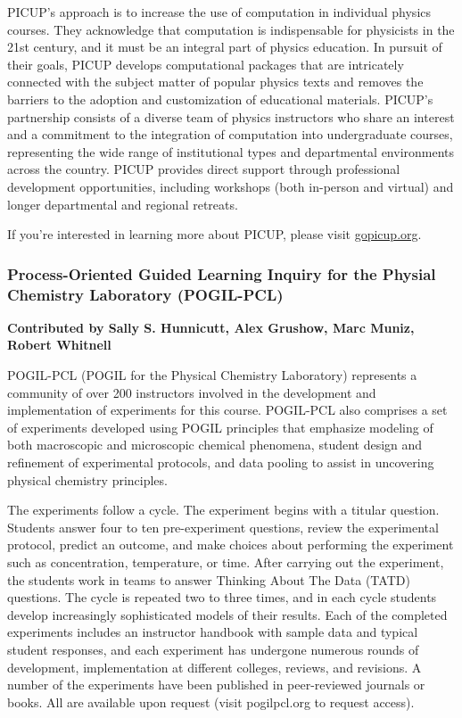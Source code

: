 \documentclass[9pt,review]{livecoms}
\begin{document}
PICUP's approach is to increase the use of computation in individual physics courses. They acknowledge that computation is indispensable for physicists in the 21st century, and it must be an integral part of physics education. In pursuit of their goals, PICUP develops computational packages that are intricately connected with the subject matter of popular physics texts and removes the barriers to the adoption and customization of educational materials. PICUP's partnership consists of a diverse team of physics instructors who share an interest and a commitment to the integration of computation into undergraduate courses, representing the wide range of institutional types and departmental environments across the country. PICUP provides direct support through professional development opportunities, including workshops (both in-person and virtual) and longer departmental and regional retreats. 

If you're interested in learning more about PICUP, please visit \href{https://gopicup.org}{gopicup.org}.

\subsubsection{Process-Oriented Guided Learning Inquiry for the Physial Chemistry Laboratory (POGIL-PCL)}

\textbf{Contributed by Sally S. Hunnicutt, Alex Grushow, Marc Muniz, Robert Whitnell}

POGIL-PCL (POGIL for the Physical Chemistry Laboratory) represents a community of over 200 instructors involved in the development and implementation of experiments for this course. POGIL-PCL also comprises a set of experiments developed using POGIL principles that emphasize modeling of both macroscopic and microscopic chemical phenomena, student design and refinement of experimental protocols, and data pooling to assist in uncovering physical chemistry principles. 

The experiments follow a cycle. The experiment begins with a titular question. Students answer four to ten pre-experiment questions, review the experimental protocol, predict an outcome, and make choices about performing the experiment such as concentration, temperature, or time. After carrying out the experiment, the students work in teams to answer Thinking About The Data (TATD) questions. The cycle is repeated two to three times, and in each cycle students develop increasingly sophisticated models of their results. Each of the completed experiments includes an instructor handbook with sample data and typical student responses, and each experiment has undergone numerous rounds of development, implementation at different colleges, reviews, and revisions. A number of the experiments have been published in peer-reviewed journals or books. All are available upon request (visit pogilpcl.org to request access).
\end{document}
